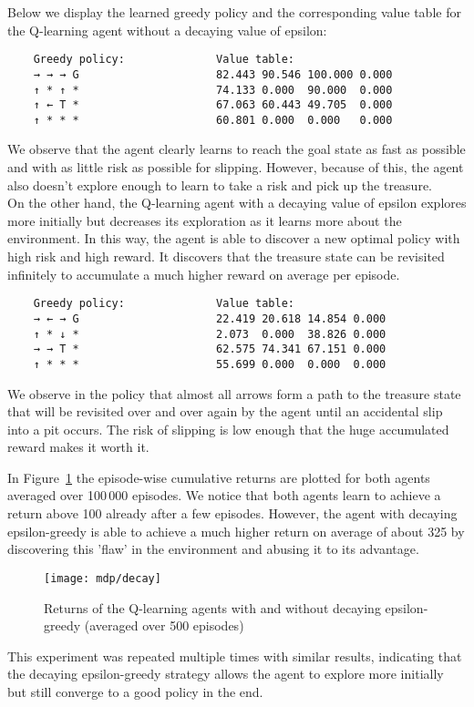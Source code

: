 \documentclass[10pt]{article}
\begin{document}
    Below we display the learned greedy policy and the corresponding value table for the Q-learning agent without a
    decaying value of epsilon:
    \begin{verbatim}
    Greedy policy:              Value table:
    → → → G                     82.443 90.546 100.000 0.000
    ↑ * ↑ *                     74.133 0.000  90.000  0.000
    ↑ ← T *                     67.063 60.443 49.705  0.000
    ↑ * * *                     60.801 0.000  0.000   0.000\end{verbatim}
    We observe that the agent clearly learns to reach the goal state as fast as possible and with as little risk
    as possible for slipping.
    However, because of this, the agent also doesn't explore enough to learn to take a risk and pick up the treasure.\\
    On the other hand, the Q-learning agent with a decaying value of epsilon explores more initially but decreases
    its exploration as it learns more about the environment.
    In this way, the agent is able to discover a new optimal policy with high risk and high reward.
    It discovers that the treasure state can be revisited infinitely to accumulate a much higher reward on average per
    episode.
    \begin{verbatim}
    Greedy policy:              Value table:
    → ← → G                     22.419 20.618 14.854 0.000
    ↑ * ↓ *                     2.073  0.000  38.826 0.000
    → → T *                     62.575 74.341 67.151 0.000
    ↑ * * *                     55.699 0.000  0.000  0.000\end{verbatim}
    We observe in the policy that almost all arrows form a path to the treasure state that will be revisited over and over
    again by the agent until an accidental slip into a pit occurs.
    The risk of slipping is low enough that the huge accumulated reward makes it worth it.

    In Figure~\ref{fig:cum} the episode-wise cumulative returns are plotted for both agents averaged over 100\,000 episodes.
    We notice that both agents learn to achieve a return above 100 already after a few episodes.
    However, the agent with decaying epsilon-greedy is able to achieve a much higher return on average of about 325
    by discovering this 'flaw' in the environment and abusing it to its advantage.
    \begin{figure}
        \centering
        \texttt{[image: mdp/decay]}
        \caption{Returns of the Q-learning agents with and without decaying epsilon-greedy (averaged over 500 episodes)}
        \label{fig:cum}
    \end{figure}

    This experiment was repeated multiple times with similar results, indicating that the decaying epsilon-greedy
    strategy allows the agent to explore more initially but still converge to a good policy in the end.
\end{document}
